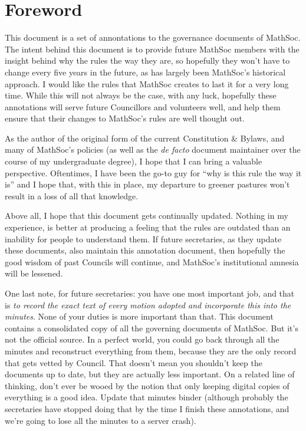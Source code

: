 \section{Foreword}

This document is a set of annontations to the governance documents of MathSoc.
The intent behind this document is to provide future MathSoc members with the
insight behind why the rules the way they are, so hopefully they won't have to
change every five years in the future, as has largely been MathSoc's historical
approach. I would like the rules that MathSoc creates to last it for a very long
time. While this will not always be the case, with any luck, hopefully these
annotations will serve future Councillors and volunteers well, and help them
ensure that their changes to MathSoc's rules are well thought out.

As the author of the original form of the current Constitution \& Bylaws, and
many of MathSoc's policies (as well as the \emph{de facto} document maintainer
over the course of my undergraduate degree), I hope that I can bring a valuable
perspective. Oftentimes, I have been the go-to guy for ``why is this rule the way
it is'' and I hope that, with this in place, my departure to greener pastures
won't result in a loss of all that knowledge.

Above all, I hope that this document gets continually updated. Nothing in my
experience, is better at producing a feeling that the rules are outdated than an
inability for people to understand them. If future secretaries, as they update
these documents, also maintain this annotation document, then hopefully the good
wisdom of past Councils will continue, and MathSoc's institutional amnesia will
be lessened.

One last note, for future secretaries: you have one most important job, and that
is \emph{to record the exact text of every motion adopted and incorporate this
into the minutes}. None of your duties is more important than that. This
document contains a consolidated copy of all the governing documents of MathSoc.
But it's not the official source. In a perfect world, you could go back through
all the minutes and reconstruct everything from them, because they are the only
record that gets vetted by Council. That doesn't mean you shouldn't keep the
documents up to date, but they are actually less important. On a related line of
thinking, don't ever be wooed by the notion that only keeping digital copies of
everything is a good idea. Update that minutes binder (although probably the
secretaries have stopped doing that by the time I finish these annotations, and
we're going to lose all the minutes to a server crash).

